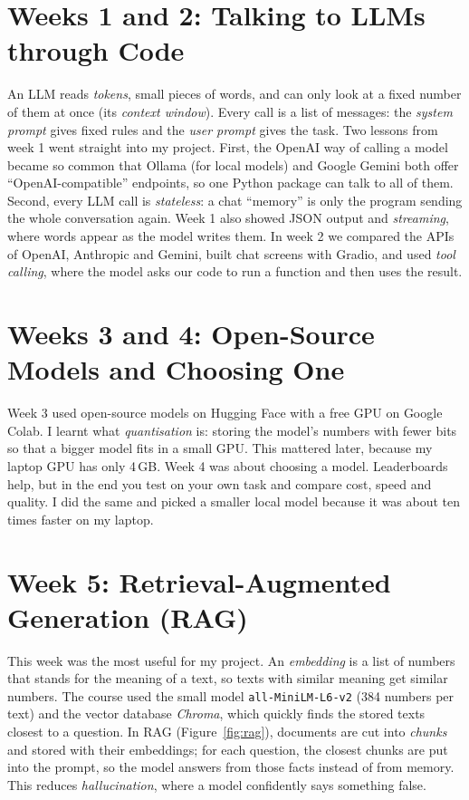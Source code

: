 \documentclass[12pt,a4paper]{report}
\newcommand{\code}[1]{\texttt{#1}}
\begin{document}
\section{Weeks 1 and 2: Talking to LLMs through Code}
An LLM reads \emph{tokens}, small pieces of words, and can only look at a fixed number of
them at once (its \emph{context window}). Every call is a list of messages: the
\emph{system prompt} gives fixed rules and the \emph{user prompt} gives the task. Two
lessons from week 1 went straight into my project. First, the OpenAI way of calling a model
became so common that Ollama (for local models) and Google Gemini both offer
``OpenAI-compatible'' endpoints, so one Python package can talk to all of them. Second, every
LLM call is \emph{stateless}: a chat ``memory'' is only the program sending the whole
conversation again. Week 1 also showed JSON output and \emph{streaming}, where words appear
as the model writes them. In week 2 we compared the APIs of OpenAI, Anthropic and Gemini,
built chat screens with Gradio, and used \emph{tool calling}, where the model asks our code
to run a function and then uses the result.

\section{Weeks 3 and 4: Open-Source Models and Choosing One}
Week 3 used open-source models on Hugging Face with a free GPU on Google Colab. I learnt what
\emph{quantisation} is: storing the model's numbers with fewer bits so that a bigger model
fits in a small GPU. This mattered later, because my laptop GPU has only 4\,GB. Week 4 was
about choosing a model. Leaderboards help, but in the end you test on your own task and
compare cost, speed and quality. I did the same and picked a smaller local model because it
was about ten times faster on my laptop.

\section{Week 5: Retrieval-Augmented Generation (RAG)}
This week was the most useful for my project. An \emph{embedding} is a list of numbers that
stands for the meaning of a text, so texts with similar meaning get similar numbers. The
course used the small model \code{all-MiniLM-L6-v2} (384 numbers per text) and the vector
database \emph{Chroma}, which quickly finds the stored texts closest to a question. In RAG
(Figure~\ref{fig:rag}), documents are cut into \emph{chunks} and stored with their
embeddings; for each question, the closest chunks are put into the prompt, so the model
answers from those facts instead of from memory. This reduces \emph{hallucination}, where a
model confidently says something false.
\end{document}
